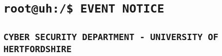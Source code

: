 \documentclass[10pt,a5paper,english]{book}
\begin{document}
  \section*{\texttt{root@uh:/\$ EVENT NOTICE}}
  
  \subsection*{\texttt{CYBER SECURITY DEPARTMENT - UNIVERSITY OF HERTFORDSHIRE}}
\end{document}
